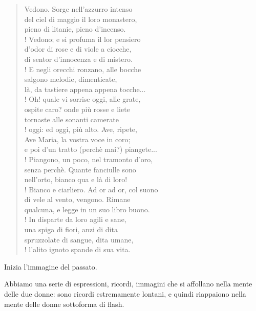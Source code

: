 \documentclass[a4paper, twoside, titlepage]{book}
\begin{document}
\begin{verse}
Vedono. Sorge nell’azzurro intenso\\
del ciel di maggio il loro monastero,\\
pieno di litanie, pieno d’incenso.\\!
Vedono; e si profuma il lor pensiero\\
d’odor di rose e di viole a ciocche,\\
di sentor d’innocenza e di mistero.\\!
E negli orecchi ronzano, alle bocche\\
salgono melodie, dimenticate,\\
là, da tastiere appena appena tocche...\\!
Oh! quale vi sorrise oggi, alle grate,\\
ospite caro? onde più rosse e liete\\
tornaste alle sonanti camerate\\!
oggi: ed oggi, più alto. Ave, ripete,\\
Ave Maria, la vostra voce in coro;\\
e poi d’un tratto (perchè mai?) piangete...\\!
Piangono, un poco, nel tramonto d’oro,\\
senza perchè. Quante fanciulle sono\\
nell’orto, bianco qua e là di loro!\\!
Bianco e ciarliero. Ad or ad or, col suono\\
di vele al vento, vengono. Rimane\\
qualcuna, e legge in un suo libro buono.\\!
In disparte da loro agili e sane,\\
una spiga di fiori, anzi di dita\\
spruzzolate di sangue, dita umane,\\!
l’alito ignoto spande di sua vita.
\end{verse}

Inizia l'immagine del passato.

Abbiamo una serie di espressioni, ricordi, immagini che si affollano nella mente delle due donne: sono ricordi estremamente lontani, e quindi riappaiono nella mente delle donne sottoforma di flash.
\end{document}
